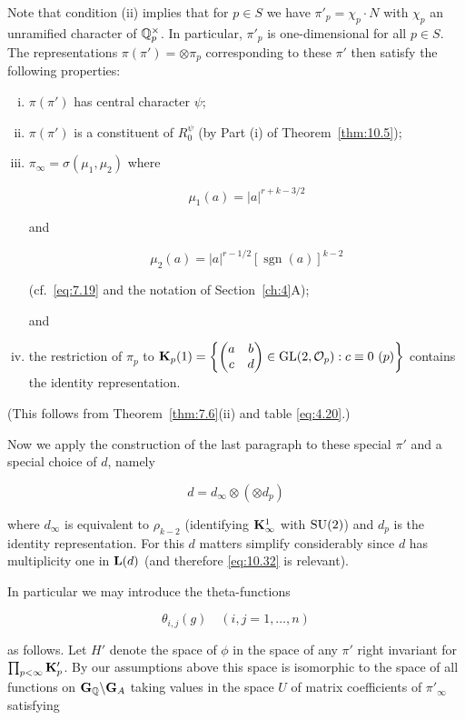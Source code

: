 Note that condition (ii) implies that for $p \in S$ we have $\pi'_p = \chi_p \cdot N$ with $\chi_p$ an unramified character of $\mathbb{Q}_p^{\times}$. In particular, $\pi'_p$ is one-dimensional for all $p \in S$. The representations $\pi(\pi') = \otimes \pi_p$ corresponding to these $\pi'$ then satisfy the following properties:

\begin{enumerate}[(i)]

\item $\pi(\pi')$ has central character $\psi$;

\item $\pi(\pi')$ is a constituent of $R^{\psi}_0$ (by Part (i) of Theorem~\ref{thm:10.5});

\item $\pi_\infty = \sigma(\mu_1, \mu_2)$ where

\[
\mu_1(a) = |a|^{r + k - 3/2}
\]

and

\[
\mu_2(a) = |a|^{r - 1/2}[\operatorname{sgn}(a)]^{k - 2}
\]

(cf.\ \eqref{eq:7.19} and the notation of Section~\ref{ch:4}A);

and

\item the restriction of $\pi_p$ to $\bK_p(1) = \left\{\begin{pmatrix} a & b \\ c & d \end{pmatrix} \in \GL(2, \mathcal{O}_p): c \equiv 0\ (p)\right\}$ contains the identity representation.

\end{enumerate}

(This follows from Theorem~\ref{thm:7.6}(ii) and table \eqref{eq:4.20}.)

Now we apply the construction of the last paragraph to these special $\pi'$ and a special choice of $d$, namely

\[
d = d_\infty \otimes (\otimes d_p)
\]

where $d_\infty$ is equivalent to $\rho_{k-2}$ (identifying $\mathbf{K}_\infty^1$ with $\operatorname{SU}(2)$) and $d_p$ is the identity representation. For this $d$ matters simplify considerably since $d$ has multiplicity one in $\mathbf{L}(d)$ (and therefore \eqref{eq:10.32} is relevant).

In particular we may introduce the theta-functions

\[
\theta_{i, j}(g) \quad (i, j = 1, \dots, n)
\]

as follows. Let $H'$ denote the space of $\phi$ in the space of any $\pi'$ right invariant for $\prod_{p < \infty} \mathbf{K}'_p$. By our assumptions above this space is isomorphic to the space of all functions on $\mathbf{G}_{\mathbb{Q}} \backslash \mathbf{G}_A$ taking values in the space $U$ of matrix coefficients of $\pi'_\infty$ satisfying

